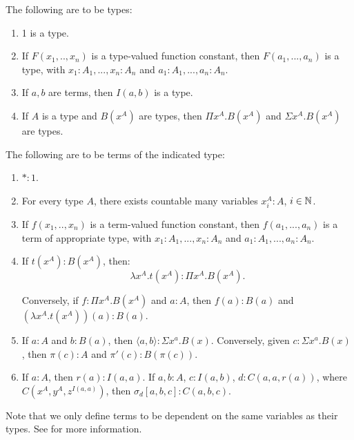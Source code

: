 \begin{definition}
  The following are to be types:
  \begin{enumerate}
  \item 1 is a type.
  \item If $F(x_1,..,x_n)$ is a type-valued function constant, then $F(a_1,...,a_n)$ is a type, with  $x_1:A_1,...,x_n:A_n$ and $a_1:A_1,...,a_n:A_n$.
  \item If $a,b$ are terms, then $I(a,b)$ is a type.
  \item If $A$ is a type and $B(x^A)$ are types, then $\Pi x^A. B(x^A)$ and  $\Sigma x^A. B(x^A)$ are types.
  \end{enumerate}
\end{definition}

\begin{definition}\label{1.1.2-seely}
  The following are to be terms of the indicated type:
  \begin{enumerate}
  \item $*:1$.
  \item For every type $A$, there exists countable many variables $x_i^A : A$, $i\in \mathbb{N}$.
  \item If $f(x_1,..,x_n)$ is a term-valued function constant, then $f(a_1,...,a_n)$ is a term of appropriate type, with  $x_1:A_1,...,x_n:A_n$ and $a_1:A_1,...,a_n:A_n$.
  \item If $t(x^A) : B(x^A)$, then:
    $$\lambda x^A.t(x^A) : \Pi x^A. B(x^A).$$

    Conversely, if $f : \Pi x^A. B(x^A)$ and $a:A$, then  $f(a) : B(a)$ and $(\lambda x^A.t(x^A))(a) : B(a)$.
  \item If $a:A$ and $b:B(a)$, then $\langle a, b\rangle : \Sigma x^a. B(x)$. Conversely, given $c : \Sigma x^a. B(x)$, then $\pi (c) : A$ and $\pi'(c) : B(\pi(c))$. 
  \item If $a:A$, then $r(a): I(a,a)$. If $a,b : A$, $c : I(a,b)$, $d : C(a,a,r(a))$, where $C(x^A,y^A,z^{I(a,a)})$, then $\sigma_d[a,b,c] : C(a,b,c)$.  
  \end{enumerate}
\end{definition}

\begin{remark}
  Note that we only define terms to be dependent on the same variables as their types. See \cite[Section 2.2]{martinlof1973intuitionistic} for more information.
\end{remark}


